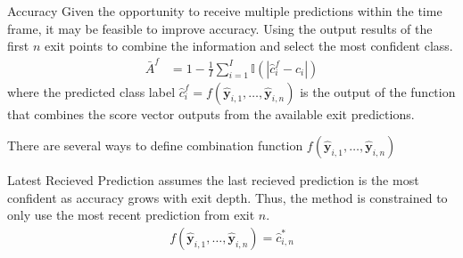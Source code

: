 \begin{enumdescript}
\begin{enumdescript}
	\end{enumdescript}
	
	\item[Accuracy] Given the opportunity to receive multiple predictions within the time frame, it may be feasible to improve accuracy. Using the output results of the first $ n $ exit points to combine the information and select the most confident class. 
	\begin{align}
	\bar{A}^f &= 1 - \frac{1}{I} \sum_{i=1}^{I}\mathbb{I}\left(\left|\hat{c}_i^f-c_i\right|\right)
	\end{align}
	where the predicted class label $ \hat{c}_i^f = f(\bm{\hat{y}}_{i,1},\dots, \bm{\hat{y}}_{i,n}) $ is the output of the function that combines the score vector outputs from the available exit predictions. 
	
	There are several ways to define combination function $ f\left(\bm{\hat{y}}_{i,1}, \dots, \bm{\hat{y}}_{i,n}\right) $
	\begin{enumdescript}
		
		\item[Latest Recieved Prediction] assumes the last recieved prediction is the most confident as accuracy grows with exit depth. Thus, the method is constrained to only use the most recent prediction from exit $n$.
		\begin{align}
		f\left(\bm{\hat{y}}_{i,1}, \dots, \bm{\hat{y}}_{i,n} \right) = \hat{c}_{i,n}^{*}
		\end{align}
		

\end{enumdescript}
\end{enumdescript}
